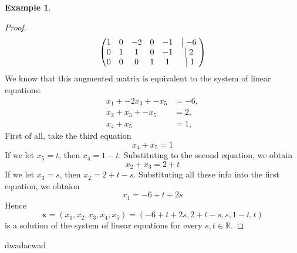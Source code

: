 \documentclass[a4paper]{article}
\theoremstyle{definition}
\newtheorem*{eg}{Example}
\begin{document}
\begin{eg}
\begin{proof}
\begin{equation*}
\begin{pmatrix}
               1 & 0 & -2 & 0 & -1 &\bigm|  -6\; \\
               0 & 1 & 1 & 0 & -1 &\bigm|  2\; \\ 
               0 & 0 & 0 & 1 & 1 &\;\bigm|  1 \;
          \end{pmatrix}
     \end{equation*}
     We know that this augmented matrix is equivalent to the 
     system of linear equations:
     \begin{align*}
          x_1+   -2x_3+   -x_5 &= -6, \\
               x_2+x_3+   -x_5 &= 2, \\
                       x_4+x_5 &= 1, 
     \end{align*}
     First of all, take the third equation 
     \begin{equation*}
          x_4+x_5 =1
     \end{equation*}
     If we let $x_5 = t$, then $x_4=1-t$. Substituting to the 
     second equation, we obtain
     \begin{equation*}
          x_2+x_3 =2+t
     \end{equation*}
     If we let $x_3=s$, then $x_2=2+t-s$. Substituting all these
     info into the first equation, we obtaion
     \begin{equation*}
          x_1 =-6+t+2s
     \end{equation*}
     Hence
     \begin{equation*}
          \mathrm{\textbf{x}}=(x_1,x_2,x_3,x_4,x_5) = (-6+t+2s,2+t-s,s,1-t,t)
     \end{equation*}
     is a solution of the system of linear equations for every 
     $s,t \in \mathbb{R}$.
\end{proof}
\end{eg}
dwadacwad
\end{document}
